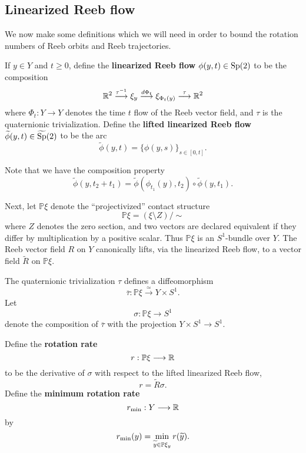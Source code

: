 \subsection{Linearized Reeb flow}

We now make some definitions which we will need in order to bound the rotation numbers of Reeb orbits and Reeb trajectories.

\begin{definition}
\label{def:linearized}
If $y\in Y$ and $t\ge 0$, define the {\bf linearized Reeb flow\/} $\phi(y,t)\in\operatorname{Sp}(2)$ to be the composition
\begin{equation}
\label{eqn:lrf}
{\mathbb R}^2 \stackrel{\tau^{-1}}{\longrightarrow} \xi_y \stackrel{d\Phi_t}{\longrightarrow} \xi_{\Phi_t(y)} \stackrel{\tau}{\longrightarrow} {\mathbb R}^2
\end{equation}
where $\Phi_t:Y\to Y$ denotes the time $t$ flow of the Reeb vector field, and $\tau$ is the quaternionic trivialization. Define the {\bf lifted linearized Reeb flow\/} $\widetilde{\phi}(y,t)\in\widetilde{\operatorname{Sp}}(2)$ to be the arc
\begin{equation}
\label{eqn:llrf}
\widetilde{\phi}(y,t) = 
\{\phi(y,s)\}_{s\in [0,t]}.
\end{equation}
\end{definition}

Note that we have the composition property
\[
\widetilde{\phi}(y,t_2+t_1) = \widetilde{\phi}(\phi_{t_1}(y),t_2) \circ \widetilde{\phi}(y,t_1).
\]

Next, let ${\mathbb P}\xi$ denote the ``projectivized'' contact structure
\[
{\mathbb P}\xi = (\xi\setminus Z)/\sim
\]
where $Z$ denotes the zero section, and two vectors are declared equivalent if they differ by multiplication by a positive scalar. Thus ${\mathbb P}\xi$ is an $S^1$-bundle over $Y$. The Reeb vector field $R$ on $Y$ canonically lifts, via the linearized Reeb flow, to a vector field $\widetilde{R}$ on ${\mathbb P}\xi$.

The quaternionic trivialization $\tau$ defines a diffeomorphism
\[
\overline{\tau}: {\mathbb P}\xi \stackrel{\simeq}{\longrightarrow} Y\times S^1.
\]
Let
\[
\sigma: {\mathbb P}\xi\longrightarrow S^1
\]
denote the composition of $\overline{\tau}$ with the projection $Y\times S^1\to S^1$.

\begin{definition}
Define the {\bf rotation rate\/}
\[
r: {\mathbb P}\xi\longrightarrow {\mathbb R}
\]
to be the derivative of $\sigma$ with respect to the lifted linearized Reeb flow,
\[
r=\widetilde{R}\sigma.
\]
Define the {\bf minimum rotation rate\/}
\[
r_{\operatorname{min}}:Y\longrightarrow {\mathbb R}
\]
by
\[
r_{\operatorname{min}}(y) = \min_{\widetilde{y}\in{\mathbb P}\xi_y}r(\widetilde{y}).
\]
\end{definition}

